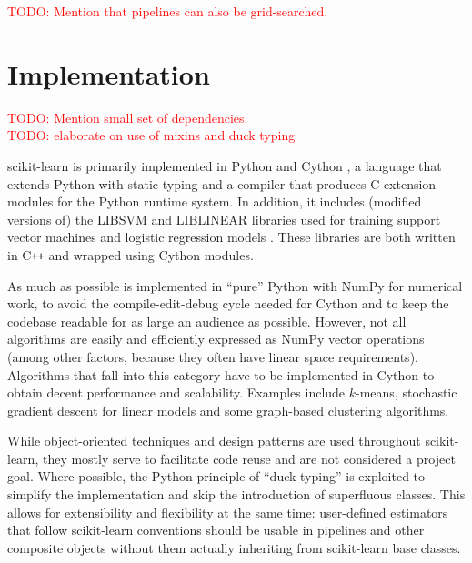 \documentclass{llncs}
\begin{document}
\textcolor{red}{TODO: Mention that pipelines can also be grid-searched.}

\section{Implementation}

\label{sec:implementation}

\noindent \textcolor{red}{TODO: Mention small set of dependencies.}\\
\textcolor{red}{TODO: elaborate on use of mixins and duck typing}

scikit-learn is primarily implemented in Python and Cython
\citep{behnel2011cython},
a language that extends Python with static typing
and a compiler that produces C extension modules
for the Python runtime system.
In addition, it includes (modified versions of)
the \textsf{LIBSVM} and \textsf{LIBLINEAR} libraries
used for training support vector machines
and logistic regression models \citep{chang2011libsvm, fan2008}.
These libraries are both written in C{}\verb!++!
and wrapped using Cython modules.

As much as possible is implemented in ``pure'' Python
with NumPy for numerical work,
to avoid the compile-edit-debug cycle needed for Cython
and to keep the codebase readable for as large an audience as possible.
However, not all algorithms are easily and efficiently expressed
as NumPy vector operations
(among other factors, because they often have linear space requirements).
Algorithms that fall into this category have to be implemented in Cython
to obtain decent performance and scalability.
Examples include $k$-means, stochastic gradient descent for linear models
and some graph-based clustering algorithms.

While object-oriented techniques and design patterns
are used throughout scikit-learn,
they mostly serve to facilitate code reuse and are not considered a project goal.
Where possible, the Python principle of ``duck typing'' is exploited
to simplify the implementation and skip the introduction of superfluous classes.
This allows for extensibility and flexibility at the same time:
user-defined estimators that follow scikit-learn conventions
should be usable in pipelines and other composite objects
without them actually inheriting from scikit-learn base classes.

\end{document}
